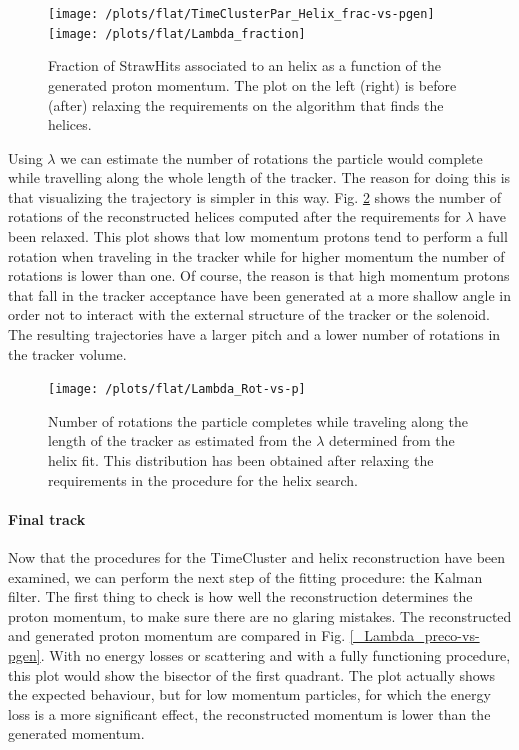 \documentclass[12pt,a4paper,openright, oneside, titlepage]{book} %
\begin{document}
\begin{figure}[h!]
\centering
\texttt{[image: /plots/flat/TimeClusterPar\_Helix\_frac-vs-pgen]}\hfill
\texttt{[image: /plots/flat/Lambda\_fraction]}
\caption[Fraction of StrawHits in a helix as a function of generated momentum]{Fraction of StrawHits associated to an helix as a function of the generated proton momentum. 
The plot on the left (right) is before (after) relaxing 
the requirements on the algorithm that finds the helices.}
\label{_active_SH_fraction}
\end{figure}

\noindent Using $\lambda$ we can estimate the number of rotations the particle 
would complete while travelling along the whole length of the tracker. 
The reason for doing this is that visualizing the trajectory is simpler in this way. 
Fig. \ref{_Lambda_Rot-vs-p} shows
the number of rotations of the reconstructed helices computed 
after the requirements for $\lambda$ have been relaxed.
This plot shows that low momentum protons tend to perform a full rotation when traveling in the tracker 
while for higher momentum the number of rotations is lower than one. 
Of course, the reason is that high momentum protons that fall in the tracker acceptance have been generated 
at a more shallow angle in order not to interact 
with the external structure of the tracker or the solenoid. 
The resulting trajectories have a larger pitch and a lower number of rotations in the tracker volume.\\


\begin{figure}[h!]
\centering
\texttt{[image: /plots/flat/Lambda\_Rot-vs-p]}
\caption[Number or full rotation in the tracker per generated momentum]
{Number of rotations the particle completes while traveling along the length of the tracker 
as estimated from the $\lambda$ determined from the helix fit. 
This distribution has been obtained after relaxing the requirements in the procedure for the helix search.}
\label{_Lambda_Rot-vs-p}
\end{figure}

\paragraph{Final track}
Now that the procedures for the TimeCluster and helix reconstruction have been examined, 
we can perform the next step of the fitting procedure: the Kalman filter. 
The first thing to check is how well the reconstruction determines the proton momentum, 
to make sure there are no glaring mistakes. 
The reconstructed and generated proton momentum 
are compared in Fig. \ref{_Lambda_preco-vs-pgen}. 
With no energy losses or scattering and with a fully functioning procedure, 
this plot would show the bisector of the first quadrant. 
The plot actually shows the expected behaviour, 
but for low momentum particles, 
for which the energy loss is a more significant effect, 
the reconstructed momentum is lower than the generated momentum. 
\end{document}
